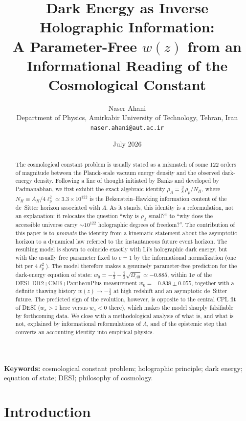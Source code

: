 \documentclass[11pt,a4paper]{article}
\title{\bfseries Dark Energy as Inverse Holographic Information:\\
A Parameter-Free $w(z)$ from an Informational Reading of the Cosmological Constant}
\author{Naser Ahani\\
\small Department of Physics, Amirkabir University of Technology, Tehran, Iran\\
\small \texttt{naser.ahani@aut.ac.ir}}
\date{July 2026}
\begin{document}
\maketitle

\begin{abstract}
\noindent
The cosmological constant problem is usually stated as a mismatch of some
122 orders of magnitude between the Planck-scale vacuum energy density and the
observed dark-energy density. Following a line of thought initiated by Banks
and developed by Padmanabhan, we first exhibit the exact algebraic identity
$\rho_\Lambda = \tfrac{3}{8}\,\rho_p/N_H$, where
$N_H \equiv A_H/4\ell_p^2 \simeq 3.3\times10^{122}$ is the
Bekenstein--Hawking information content of the de~Sitter horizon associated
with $\Lambda$. As it stands, this identity is a reformulation, not an
explanation: it relocates the question ``why is $\rho_\Lambda$ small?'' to
``why does the accessible universe carry $\sim 10^{122}$ holographic degrees
of freedom?''. The contribution of this paper is to \emph{promote} the
identity from a kinematic statement about the asymptotic horizon to a
dynamical law referred to the instantaneous future event horizon. The
resulting model is shown to coincide exactly with Li's holographic dark
energy, but with the usually free parameter fixed to $c=1$ by the
informational normalization (one bit per $4\ell_p^2$). The model therefore
makes a genuinely parameter-free prediction for the dark-energy equation of
state: $w_0 = -\tfrac13 - \tfrac23\sqrt{\Omega_{\Lambda 0}} \simeq -0.885$,
within $1\sigma$ of the DESI~DR2+CMB+PantheonPlus measurement
$w_0 = -0.838\pm0.055$, together with a definite thawing history
$w(z)\to -\tfrac13$ at high redshift and an asymptotic de~Sitter future.
The predicted sign of the evolution, however, is opposite to the central
CPL fit of DESI ($w_a>0$ here versus $w_a<0$ there), which makes the model
sharply falsifiable by forthcoming data. We close with a methodological
analysis of what is, and what is not, explained by informational
reformulations of $\Lambda$, and of the epistemic step that converts an
accounting identity into empirical physics.
\end{abstract}

\vspace{1ex}
\noindent\textbf{Keywords:} cosmological constant problem; holographic principle;
dark energy; equation of state; DESI; philosophy of cosmology.

\section{Introduction}
\label{sec:intro}
\end{document}
